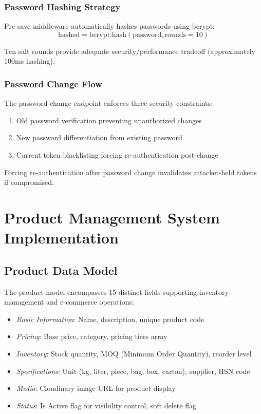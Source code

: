 \documentclass[conference]{IEEEtran}
\begin{document}
\subsubsection{Password Hashing Strategy}
Pre-save middleware automatically hashes passwords using bcrypt:
\begin{equation}
\text{hashed} = \text{bcrypt.hash}(\text{password}, \text{rounds}=10)
\end{equation}

Ten salt rounds provide adequate security/performance tradeoff (approximately 100ms hashing).

\subsubsection{Password Change Flow}
The password change endpoint enforces three security constraints:
\begin{enumerate}
\item Old password verification preventing unauthorized changes
\item New password differentiation from existing password
\item Current token blacklisting forcing re-authentication post-change
\end{enumerate}

Forcing re-authentication after password change invalidates attacker-held tokens if compromised.

\section{Product Management System Implementation}

\subsection{Product Data Model}

The product model encompasses 15 distinct fields supporting inventory management and e-commerce operations:

\begin{itemize}
\item \textit{Basic Information}: Name, description, unique product code
\item \textit{Pricing}: Base price, category, pricing tiers array
\item \textit{Inventory}: Stock quantity, MOQ (Minimum Order Quantity), reorder level
\item \textit{Specifications}: Unit (kg, liter, piece, bag, box, carton), supplier, HSN code
\item \textit{Media}: Cloudinary image URL for product display
\item \textit{Status}: Is Active flag for visibility control, soft delete flag
\end{itemize}
\end{document}
